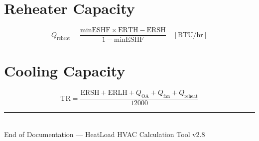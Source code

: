 \documentclass[12pt, a4paper, oneside]{report}
\begin{document}
\section{Reheater Capacity}
\begin{equation}
  Q_{\text{reheat}} = \frac{\text{minESHF} \times \text{ERTH} - \text{ERSH}}{1 - \text{minESHF}} \quad [\text{BTU/hr}]
\end{equation}

\section{Cooling Capacity}
\begin{equation}
  \text{TR} = \frac{\text{ERSH} + \text{ERLH} + Q_{\text{OA}} + Q_{\text{fan}} + Q_{\text{reheat}}}{12000}
\end{equation}


\vfill
\begin{center}
\rule{0.5\textwidth}{0.4pt}\\[0.5em]
{\small\textcolor{codegray}{End of Documentation --- HeatLoad HVAC Calculation Tool v2.8}}
\end{center}
\end{document}

